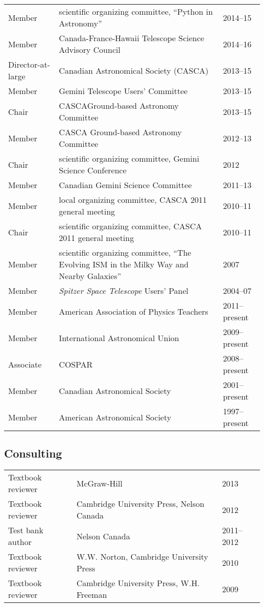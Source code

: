 \documentclass[12pt]{article}
\begin{document}
\vspace{0.5cm}
\begin{tabular}{lp{12cm}l}
Member& scientific organizing committee, ``Python in Astronomy'' & 2014--15\\
Member& Canada-France-Hawaii Telescope Science Advisory Council& 2014--16\\
Director-at-large& Canadian Astronomical Society (CASCA)& 2013--15\\
Member&  Gemini Telescope Users' Committee& 2013--15\\
Chair& CASCAGround-based Astronomy Committee& 2013--15\\
Member& CASCA Ground-based Astronomy Committee& 2012--13\\
Chair& scientific organizing committee, Gemini Science Conference& 2012\\
Member& Canadian Gemini Science Committee& 2011--13\\
Member& local organizing committee, CASCA 2011 general meeting&2010--11\\
Chair& scientific organizing committee, CASCA 2011 general meeting&2010--11\\
Member& scientific organizing committee, ``The Evolving ISM in the Milky Way and Nearby Galaxies'' & 2007\\
Member& {\it Spitzer Space Telescope} Users' Panel& 2004--07\\
Member& American Association of Physics Teachers& 2011--present\\
Member& International Astronomical Union& 2009--present\\
Associate& COSPAR& 2008--present\\
Member& Canadian Astronomical Society& 2001--present\\
Member& American Astronomical Society& 1997--present
\end{tabular}

\subsection{Consulting}
\begin{tabular}{lll}
Textbook reviewer& McGraw-Hill& 2013\\
Textbook reviewer & Cambridge University Press, Nelson Canada&2012\\
Test bank author& Nelson Canada& 2011--2012\\
Textbook reviewer& W.W. Norton, Cambridge University Press& 2010\\
Textbook reviewer& Cambridge University Press, W.H. Freeman& 2009
\end{tabular}
\end{document}
